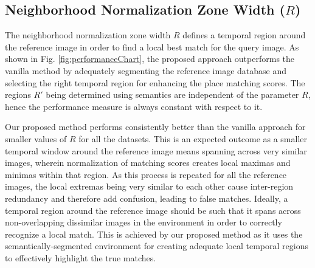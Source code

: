 \documentclass[letterpaper, 10 pt, conference]{ieeeconf}  %
\begin{document}


\subsection{Neighborhood Normalization Zone Width ($R$)}
The neighborhood normalization zone width $R$ defines a temporal region around the reference image in order to find a local best match for the query image. As shown in Fig. \ref{fig:performanceChart}, the proposed approach outperforms the vanilla method by adequately segmenting the reference image database and selecting the right temporal region for enhancing the place matching scores. The regions $R'$ being determined using semantics are independent of the parameter $R$, hence the performance measure is always constant with respect to it.

Our proposed method performs consistently better than the vanilla approach for smaller values of $R$ for all the datasets. This is an expected outcome as a smaller temporal window around the reference image means spanning across very similar images, wherein normalization of matching scores creates local maximas and minimas within that region. As this process is repeated for all the reference images, the local extremas being very similar to each other cause inter-region redundancy and therefore add confusion, leading to false matches. Ideally, a temporal region around the reference image should be such that it spans across non-overlapping dissimilar images in the environment in order to correctly recognize a local match. This is achieved by our proposed method as it uses the semantically-segmented environment for creating adequate local temporal regions to effectively highlight the true matches.
\end{document}
